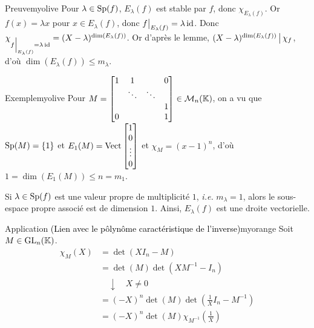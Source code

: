    \begin{demo}{Preuve}{myolive}
        Pour $\lambda \in \operatorname{Sp}(f)$, $E_{\lambda}(f)$ est stable par $f$, donc $\chi_{E_{\lambda}(f)}$. Or $f(x) = \lambda x$ pour $x \in E_{\lambda}(f)$, donc $\restr{f}{E_{\lambda}(f)} = \lambda \id$. Donc $\chi_{\restr{f}{E_{\lambda}(f)} = \lambda \id} = (X - \lambda)^{\dim(E_{\lambda}(f))}$. Or d’après le lemme, $(X - \lambda)^{\dim(E_{\lambda}(f))} \, \big| \, \chi_{f}$, d’où $\dim(E_{\lambda}(f)) \leq m_{\lambda}$.
    \end{demo}

    \begin{omed}{Exemple}{myolive}
        Pour $M = \begin{bmatrix}
                1 & 1 & & 0 \\
                 & \ddots & \ddots & \\
                 & & & 1 \\
                0 & & & 1
            \end{bmatrix} \in \mathcal{M}_{n}(\mathbb{K})$, on a vu que $\operatorname{Sp}(M) = \left\{1\right\}$ et $E_1(M) = \operatorname{Vect}\begin{bmatrix}
                1 \\
                0 \\
                \vdots \\
                0
            \end{bmatrix}$ et $\chi_M = (x-1)^n$, d’où $1 = \dim(E_1(M)) \leq n = m_1$.
    \end{omed}

    \begin{coro}{}{}
        Si $\lambda \in \operatorname{Sp}(f)$ est une valeur propre de multiplicité $1$, \textit{i.e.} $m_{\lambda} = 1$, alors le sous-espace propre associé est de dimension $1$. Ainsi, $E_{\lambda}(f)$ est une droite vectorielle.
    \end{coro}

    \begin{omed}{Application \textcolor{black}{(Lien avec le pôlynôme caractéristique de l’inverse)}}{myorange}
        Soit $M \in \operatorname{GL}_n(\mathbb{K})$. 
        \begin{align*}
            \chi_M(X) 
            &= \det(X I_n - M) \\
            &= \det(M)\det(X M^{-1} - I_n) \\ 
            &\quad \downarrow \quad X \neq 0 \\
            &= (- X)^n \det(M) \det(\frac{1}{X} I_n - M^{-1}) \\
            &= (- X)^n \det(M) \chi_{M^{-1}}\left(\frac{1}{X}\right)
        \end{align*}
    \end{omed}

